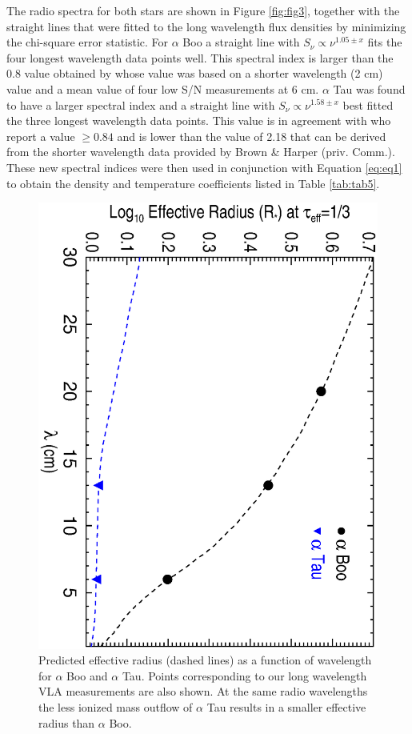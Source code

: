 \documentclass[iop]{emulateapj}
\begin{document}
The radio spectra for both stars are shown in Figure \ref{fig:fig3}, together with the straight lines that were fitted to the long wavelength flux densities by minimizing the chi-square error statistic. For $\alpha$ Boo a straight line with $S_{\nu} \propto \nu ^{1.05 \pm x}$ fits the four longest wavelength data points well. This spectral index is larger than the 0.8 value obtained by \cite{1986AJ.....91..602D} whose value was based on a shorter wavelength (2 cm) value and a mean value of four low S/N measurements at 6 cm. $\alpha$ Tau was found to have a larger spectral index and a straight line with $S_{\nu} \propto \nu ^{1.58 \pm x}$ best fitted the three longest wavelength data points. This value is in agreement with \cite{1986AJ.....91..602D} who report a value $\ge 0.84$ and is lower than the value of 2.18 that can be derived from the shorter wavelength data provided by Brown \& Harper (priv. Comm.). These new spectral indices were then used in conjunction with Equation \ref{eq:eq1} to obtain the density and temperature coefficients listed in Table \ref{tab:tab5}.

\begin{figure}
\includegraphics[trim = 0mm 0mm 0mm 10mm, clip,scale=0.385,angle=90]{fig4.ps}
\caption{Predicted effective radius (dashed lines) as a function of wavelength for $\alpha$ Boo and $\alpha$ Tau. Points corresponding to our long wavelength VLA measurements are also shown.  At the same radio wavelengths the less ionized mass outflow of $\alpha$ Tau results in a smaller effective radius than $\alpha$ Boo.}
\label{fig:fig4}
\end{figure}
\end{document}
